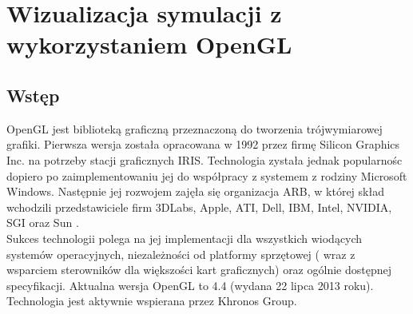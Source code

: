 \chapter{Wizualizacja symulacji z wykorzystaniem OpenGL}

\section{Wstęp}
OpenGL jest biblioteką graficzną przeznaczoną do tworzenia trójwymiarowej grafiki. Pierwsza wersja została opracowana w 1992 przez firmę Silicon Graphics Inc. na potrzeby stacji graficznych IRIS. Technologia zystała jednak popularnośc dopiero po zaimplementowaniu jej do współpracy z systemem z rodziny Microsoft Windows. Następnie jej rozwojem zajęła się organizacja ARB, w której skład wchodzili przedstawiciele firm 3DLabs, Apple, ATI, Dell, IBM, Intel, NVIDIA, SGI oraz Sun \cite{openGL}.\\ Sukces technologii polega na jej implementacji dla wszystkich wiodących systemów operacyjnych, niezależności od platformy sprzętowej ( wraz z wsparciem sterowników dla większości kart graficznych) oraz ogólnie dostępnej specyfikacji. Aktualna wersja OpenGL to 4.4 (wydana 22 lipca 2013 roku). Technologia jest aktywnie wspierana przez Khronos Group.

